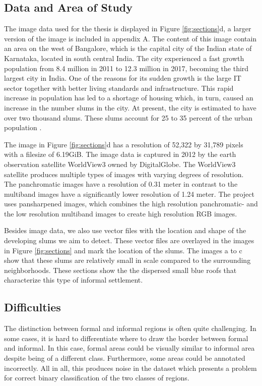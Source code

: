 \subsection{Data and Area of Study}
The image data used for the thesis is displayed in Figure \ref{fig:sections}d, a larger version of the image is included in appendix A. The content of this image contain an area on the west of Bangalore, which is the capital city of the Indian state of Karnataka, located in south central India. The city experienced a fast growth population from 8.4 million in 2011 to 12.3 million in 2017, becoming the third largest city in India\cite{popcount2017}. One of the reasons for its sudden growth is the large IT sector together with better living standards and infrastructure. This rapid increase in population has led to a shortage of housing which, in turn, caused an increase in the number slums in the city. At present, the city is estimated to have over two thousand slums. These slums account for 25 to 35 percent of the urban population \cite{roy2018survey}.

The image in Figure \ref{fig:sections}d has a resolution of 52,322 by 31,789 pixels with a filesize of 6.19GiB. The image data is captured in 2012 by the earth observation satellite WorldView3 owned by DigitalGlobe. The WorldView3 satellite produces multiple types of images with varying degrees of resolution. The panchromatic images have a resolution of 0.31 meter in contrast to  the multiband images have a significantly lower resolution of 1.24 meter. The project uses pansharpened images, which combines the high resolution panchromatic- and the low resolution multiband images to create high resolution RGB images.

Besides image data, we also use vector files with the location and shape of the developing slums we aim to detect. These vector files are overlayed in the images in Figure \ref{fig:sections} and mark the location of the slums. The images a to c show that these slums are relatively small in scale compared to the surrounding neighborhoods. These sections show the the dispersed small blue roofs that characterize this type of informal settlement. 

\subsection{Difficulties}

The distinction between formal and informal regions is often quite challenging. In some cases, it is hard to differentiate where to draw the border between formal and informal. In this case, formal areas could be visually similar to informal area despite being of a different class. Furthermore, some areas could be annotated incorrectly. All in all, this produces noise in the dataset which presents a problem for correct binary classification of the two classes of regions.

